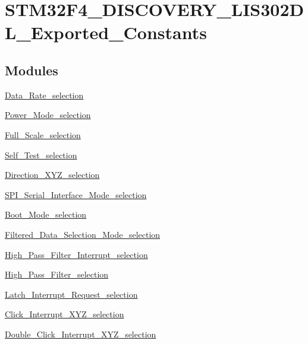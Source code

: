 \hypertarget{group___s_t_m32_f4___d_i_s_c_o_v_e_r_y___l_i_s302_d_l___exported___constants}{\section{S\-T\-M32\-F4\-\_\-\-D\-I\-S\-C\-O\-V\-E\-R\-Y\-\_\-\-L\-I\-S302\-D\-L\-\_\-\-Exported\-\_\-\-Constants}
\label{group___s_t_m32_f4___d_i_s_c_o_v_e_r_y___l_i_s302_d_l___exported___constants}
}
\subsection*{Modules}
\begin{DoxyCompactItemize}
\item 
\hyperlink{group___data___rate__selection}{Data\-\_\-\-Rate\-\_\-selection}
\item 
\hyperlink{group___power___mode__selection}{Power\-\_\-\-Mode\-\_\-selection}
\item 
\hyperlink{group___full___scale__selection}{Full\-\_\-\-Scale\-\_\-selection}
\item 
\hyperlink{group___self___test__selection}{Self\-\_\-\-Test\-\_\-selection}
\item 
\hyperlink{group___direction___x_y_z__selection}{Direction\-\_\-\-X\-Y\-Z\-\_\-selection}
\item 
\hyperlink{group___s_p_i___serial___interface___mode__selection}{S\-P\-I\-\_\-\-Serial\-\_\-\-Interface\-\_\-\-Mode\-\_\-selection}
\item 
\hyperlink{group___boot___mode__selection}{Boot\-\_\-\-Mode\-\_\-selection}
\item 
\hyperlink{group___filtered___data___selection___mode__selection}{Filtered\-\_\-\-Data\-\_\-\-Selection\-\_\-\-Mode\-\_\-selection}
\item 
\hyperlink{group___high___pass___filter___interrupt__selection}{High\-\_\-\-Pass\-\_\-\-Filter\-\_\-\-Interrupt\-\_\-selection}
\item 
\hyperlink{group___high___pass___filter__selection}{High\-\_\-\-Pass\-\_\-\-Filter\-\_\-selection}
\item 
\hyperlink{group__latch___interrupt___request__selection}{Latch\-\_\-\-Interrupt\-\_\-\-Request\-\_\-selection}
\item 
\hyperlink{group___click___interrupt___x_y_z__selection}{Click\-\_\-\-Interrupt\-\_\-\-X\-Y\-Z\-\_\-selection}
\item 
\hyperlink{group___double___click___interrupt___x_y_z__selection}{Double\-\_\-\-Click\-\_\-\-Interrupt\-\_\-\-X\-Y\-Z\-\_\-selection}
\end{DoxyCompactItemize}
